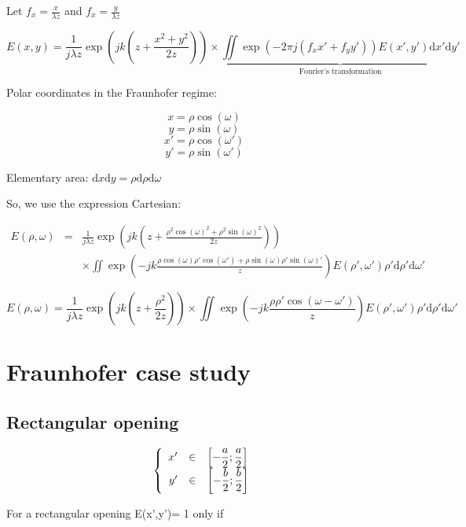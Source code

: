 \documentclass[10pt,a4paper]{article}
\begin{document}
Let $f_x=\frac{x}{\lambda z}$ and $f_x=\frac{y}{\lambda z}$

\[
E(x,y)=\frac{1}{j\lambda z} \exp\left(jk\left(z+\frac{x^2+y^2}{2z}\right)\right)
\times \underbrace{
	\iint \exp\left(-2\pi j(f_xx'+f_yy')\right)E(x',y')\mathrm{d}x'\mathrm{d}y'
}_\text{Fourier's transformation}
\]

Polar coordinates in the Fraunhofer regime:

\[x=\rho \cos(\omega) \]
\[y=\rho \sin(\omega) \]
\[x'=\rho \cos(\omega') \]
\[y'=\rho \sin(\omega') \]

Elementary area: $\mathrm{d}x\mathrm{d}y=\rho \mathrm{d}\rho \mathrm{d}\omega$

So, we use the expression Cartesian:

\[
\begin{array}{rcl}
E(\rho,\omega) & = & \frac{1}{j\lambda z} \exp\left(jk\left(z+\frac{\rho^2 \cos(\omega)^2+\rho^2 \sin(\omega)^2}{2z}\right)\right)\\
& & \times \iint \exp\left(-jk\frac{\rho \cos(\omega)\rho' \cos(\omega')+\rho \sin(\omega)\rho' \sin(\omega)'}{z}\right)
E(\rho',\omega')\rho' \mathrm{d}\rho'\mathrm{d}\omega'
\end{array}
\]

\[
E(\rho,\omega)=\frac{1}{j\lambda z} \exp\left(jk\left(z+\frac{\rho^2}{2z}\right)\right)
\times \iint \exp\left(-jk\frac{\rho\rho'\cos(\omega-\omega')}{z}\right)
E(\rho',\omega')\rho' \mathrm{d}\rho'\mathrm{d}\omega'
\]

\section{Fraunhofer case study}
	\subsection{Rectangular opening}
\[
\left \{
\begin{array}{r c l}
x' & \in & \left[-\dfrac{a}{2};\dfrac{a}{2}\right]\\
y' & \in & \left[-\dfrac{b}{2};\dfrac{b}{2}\right]
\end{array}
\right .
\]

For a rectangular opening E(x’,y’)= 1 only if
\end{document}
